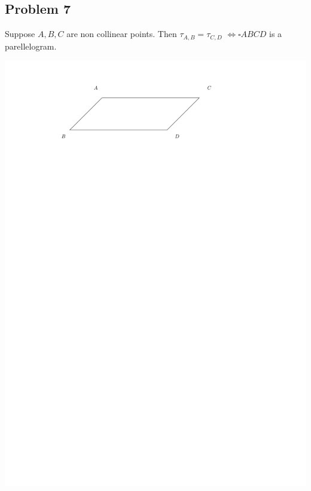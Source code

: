 \subsection{Problem 7}

Suppose \( A,B,C \) are non collinear points. Then \( \tau_{A,B} = \tau_{C,D} \) \( \iff \square ABCD\)  is a parellelogram.

\includegraphics{./figures/q7Plgm.pdf}

